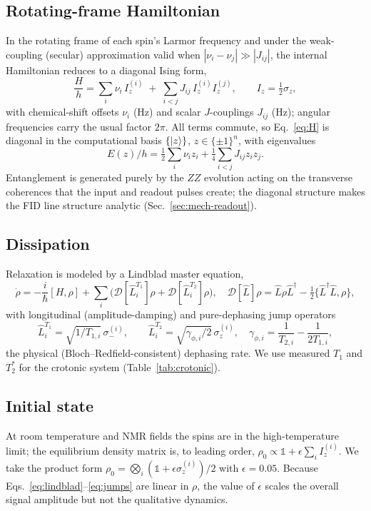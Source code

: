 \documentclass[aps,prresearch,preprint,superscriptaddress,amsmath,amssymb,floatfix]{revtex4-2}
\begin{document}
\subsection{Rotating-frame Hamiltonian}
In the rotating frame of each spin's Larmor frequency and under the weak-coupling
(secular) approximation valid when $|\nu_i-\nu_j|\gg|J_{ij}|$, the internal
Hamiltonian reduces to a diagonal Ising form,
\begin{equation}
  \frac{H}{h} = \sum_i \nu_i\, I_z^{(i)}
            \;+\; \sum_{i<j} J_{ij}\, I_z^{(i)} I_z^{(j)},
  \qquad I_z=\tfrac{1}{2}\sigma_z,
  \label{eq:H}
\end{equation}
with chemical-shift offsets $\nu_i$ (Hz) and scalar $J$-couplings $J_{ij}$ (Hz);
angular frequencies carry the usual factor $2\pi$. All terms commute, so
Eq.~\eqref{eq:H} is diagonal in the computational basis $\{\ket{z}\}$,
$z\in\{\pm1\}^n$, with eigenvalues
\begin{equation}
  E(z)/h = \tfrac12\sum_i \nu_i z_i + \tfrac14\sum_{i<j} J_{ij} z_i z_j .
  \label{eq:E}
\end{equation}
Entanglement is generated purely by the $ZZ$ evolution acting on the transverse
coherences that the input and readout pulses create; the diagonal structure makes the
FID line structure analytic (Sec.~\ref{sec:mech-readout}).

\subsection{Dissipation}
Relaxation is modeled by a Lindblad master equation,
\begin{equation}
  \dot\rho = -\frac{i}{\hbar}[H,\rho]
     + \sum_i\!\Big(\mathcal D[\hat L_i^{T_1}]\rho + \mathcal D[\hat L_i^{T_2}]\rho\Big),
  \quad \mathcal D[\hat L]\rho=\hat L\rho\hat L^\dagger-\tfrac12\{\hat L^\dagger\hat L,\rho\},
  \label{eq:lindblad}
\end{equation}
with longitudinal (amplitude-damping) and pure-dephasing jump operators
\begin{equation}
  \hat L_i^{T_1}=\sqrt{1/T_{1,i}}\,\sigma_-^{(i)},\qquad
  \hat L_i^{T_2}=\sqrt{\gamma_{\phi,i}/2}\,\sigma_z^{(i)},\quad
  \gamma_{\phi,i}=\frac{1}{T_{2,i}}-\frac{1}{2T_{1,i}} ,
  \label{eq:jumps}
\end{equation}
the physical (Bloch--Redfield-consistent) dephasing rate. We use measured $T_1$ and
$T_2^\ast$ for the crotonic system (Table~\ref{tab:crotonic}).

\subsection{Initial state}
At room temperature and NMR fields the spins are in the high-temperature limit; the
equilibrium density matrix is, to leading order,
$\rho_0\propto \mathbb{1}+\epsilon\sum_i I_z^{(i)}$. We take the product form
$\rho_0=\bigotimes_i(\mathbb 1+\epsilon\sigma_z^{(i)})/2$ with $\epsilon=0.05$. Because
Eqs.~\eqref{eq:lindblad}--\eqref{eq:jumps} are linear in $\rho$, the value of
$\epsilon$ scales the overall signal amplitude but not the qualitative dynamics.
\end{document}
